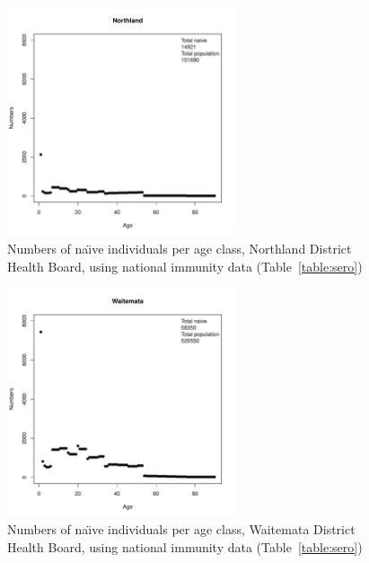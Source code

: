 \documentclass{article}
\begin{document}
\begin{itemize}
\begin{figure}[H]
     \begin{center}
     \includegraphics[width=0.6\textwidth]{dhb1.pdf}
     \end{center}
     \caption{Numbers of na\"{\i}ve individuals per age class, Northland District Health Board, using national immunity data (Table~\ref{table:sero})}
     \label{fig:Northland}
\end{figure}


\begin{figure}[H]
     \begin{center}
     \includegraphics[width=0.6\textwidth]{dhb2.pdf}
     \end{center}
     \caption{Numbers of na\"{\i}ve individuals per age class, Waitemata District Health Board, using national immunity data (Table~\ref{table:sero})}
     \label{fig:Waitemata}
\end{figure}


\end{itemize}
\end{document}
